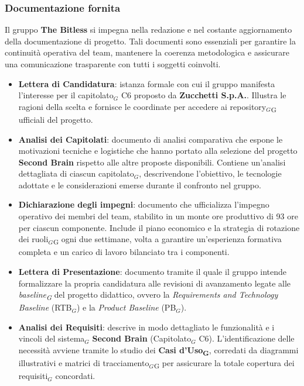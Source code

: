 \documentclass[a4paper, 10pt]{article}
\begin{document}
\label{subsubsec:doc-fornita}
\subsubsection{Documentazione fornita}
Il gruppo \textbf{The Bitless} si impegna nella redazione e nel costante aggiornamento della documentazione di progetto. Tali documenti sono essenziali per garantire la continuità operativa del team, mantenere la coerenza metodologica e assicurare una comunicazione trasparente con tutti i soggetti coinvolti.

\begin{itemize}
    \item \textbf{Lettera di Candidatura}: istanza formale con cui il gruppo manifesta l'interesse per il capitolato$_G$ C6 proposto da \textbf{Zucchetti S.p.A.}. Illustra le ragioni della scelta e fornisce le coordinate per accedere ai repository$_G$\textsubscript{G} ufficiali del progetto.

    \item \textbf{Analisi dei Capitolati}: documento di analisi comparativa che espone le motivazioni tecniche e logistiche che hanno portato alla selezione del progetto \textbf{Second Brain} rispetto alle altre proposte disponibili. Contiene un'analisi dettagliata di ciascun capitolato$_G$, descrivendone l'obiettivo, le tecnologie adottate e le considerazioni emerse durante il confronto nel gruppo.

    \item \textbf{Dichiarazione degli impegni}: documento che ufficializza l'impegno operativo dei membri del team, stabilito in un monte ore produttivo di 93 ore per ciascun componente. Include il piano economico e la strategia di rotazione dei ruoli$_G$\textsubscript{G} ogni due settimane, volta a garantire un'esperienza formativa completa e un carico di lavoro bilanciato tra i componenti.

    \item \textbf{Lettera di Presentazione}: documento tramite il quale il gruppo intende formalizzare la propria candidatura alle revisioni di avanzamento legate alle \textit{baseline\textsubscript{G}} del progetto didattico, ovvero la \textit{Requirements and Technology Baseline} (RTB$_G$) e la \textit{Product Baseline} (PB$_G$).

    \item \textbf{Analisi dei Requisiti}: descrive in modo dettagliato le funzionalità e i vincoli del sistema$_G$ \textbf{Second Brain} (Capitolato$_G$ C6). L'identificazione delle necessità avviene tramite lo studio dei \textbf{Casi d'Uso\textsubscript{G}}, corredati da diagrammi illustrativi e matrici di tracciamento$_G$\textsubscript{G} per assicurare la totale copertura dei requisiti$_G$ concordati.
    

\end{itemize}
\end{document}
